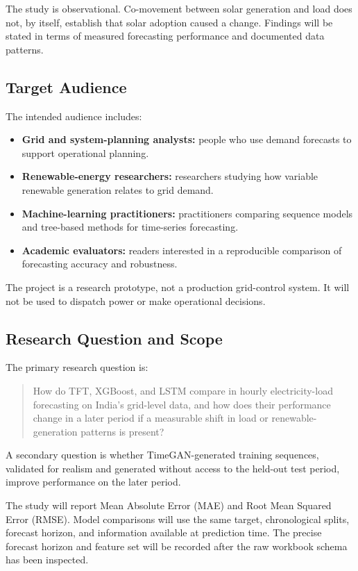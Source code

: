 \documentclass[12pt,a4paper]{article}
\begin{document}
The study is observational. Co-movement between solar generation and load does not, by itself, establish that solar adoption caused a change. Findings will be stated in terms of measured forecasting performance and documented data patterns.

\subsection{Target Audience}
The intended audience includes:
\begin{itemize}[leftmargin=*]
  \item \textbf{Grid and system-planning analysts:} people who use demand forecasts to support operational planning.
  \item \textbf{Renewable-energy researchers:} researchers studying how variable renewable generation relates to grid demand.
  \item \textbf{Machine-learning practitioners:} practitioners comparing sequence models and tree-based methods for time-series forecasting.
  \item \textbf{Academic evaluators:} readers interested in a reproducible comparison of forecasting accuracy and robustness.
\end{itemize}

The project is a research prototype, not a production grid-control system. It will not be used to dispatch power or make operational decisions.

\subsection{Research Question and Scope}
The primary research question is:
\begin{quote}
How do TFT, XGBoost, and LSTM compare in hourly electricity-load forecasting on India's grid-level data, and how does their performance change in a later period if a measurable shift in load or renewable-generation patterns is present?
\end{quote}

A secondary question is whether TimeGAN-generated training sequences, validated for realism and generated without access to the held-out test period, improve performance on the later period.

The study will report Mean Absolute Error (MAE) and Root Mean Squared Error (RMSE). Model comparisons will use the same target, chronological splits, forecast horizon, and information available at prediction time. The precise forecast horizon and feature set will be recorded after the raw workbook schema has been inspected.
\end{document}
